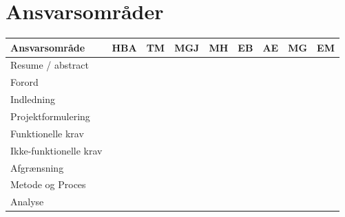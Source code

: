 \documentclass[Rapport/Rapport_main.tex]{subfiles}
\begin{document}
\section{Ansvarsområder}


\begin{longtable}{|L{0.2\textwidth}|L{0.082\textwidth}|L{0.08\textwidth}|L{0.08\textwidth}|L{0.08\textwidth}|L{0.08\textwidth}|L{0.08\textwidth}|L{0.08\textwidth}|L{0.08\textwidth}|}
        \hline
        \textbf{Ansvarsområde}  &\textbf{HBA}   &\textbf{TM}    &\textbf{MGJ}   &\textbf{MH}    &\textbf{EB}    & \textbf{AE}  & \textbf{MG}   &\textbf{EM}      \\ \hline
        Resume / abstract       &               &               &               &               &               &               &               &                \\ \hline
        Forord                  &               &               &               &               &               &               &               &                \\ \hline
        Indledning              &               &               &               &               &               &               &               &                \\ \hline
        Projektformulering      &               &               &               &               &               &               &               &                \\ \hline
        Funktionelle krav       &               &               &               &               &               &               &               &                \\ \hline
        Ikke-funktionelle krav  &               &               &               &               &               &               &               &                \\ \hline
        Afgrænsning             &               &               &               &               &               &               &               &                \\ \hline
        Metode og Proces        &               &               &               &               &               &               &               &                \\ \hline
        Analyse                 &               &               &               &               &               &               &               &                \\ \hline   

\end{longtable}
\end{document}

